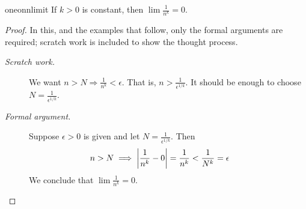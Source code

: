 \begin{thm}{}{oneonnlimit}
	If $k>0$ is constant, then $\lim\frac 1{n^k}=0$.		
\end{thm}


\begin{proof}
	In this, and the examples that follow, only the formal arguments are required; scratch work is included to show the thought process.
	\begin{description}
			\item[\normalfont\emph{Scratch work.}] We want $n>N\Longrightarrow \frac 1{n^k}<\epsilon$.	That is, $n>\frac 1{\epsilon^{1/k}}$. It should be enough to choose $N=\frac 1{\epsilon^{1/k}}$.
			
			\item[\normalfont\emph{Formal argument.}] Suppose $\epsilon>0$ is given and let $N=\frac 1{\epsilon^{1/k}}$. Then
			\[
				n>N \implies \left| \frac 1{n^k}-0\right|=\frac 1{n^k}<\frac 1{N^k}=\epsilon \tag*{\qedhere}
			\]
			We conclude that $\lim\frac 1{n^k}=0$. \qedhere
		\end{description}
\end{proof}


